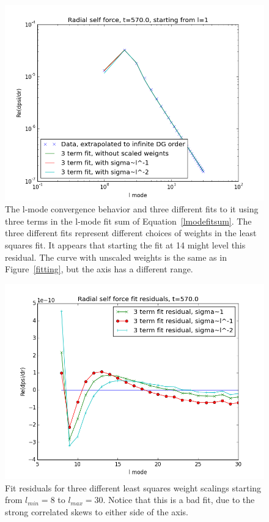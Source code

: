 \begin{figure}
  \includegraphics{fiterrscalecorrect3term570l1}
  \caption{The l-mode convergence behavior and three different fits to it using three terms in the l-mode fit sum of Equation~\ref{lmodefitsum}. The three different fits represent different choices of weights in the least squares fit. It appears that starting the fit at 14 might level this residual. The curve with unscaled weights is the same as in Figure~\ref{fitting}, but the axis has a different range.}
\label{sigmafit}
\end{figure}

\begin{figure}
\includegraphics{fitresiduals3terms570l8}
\caption{Fit residuals for three different least squares weight scalings starting from $l_{min}=8$ to $l_{max}=30$. Notice that this is a bad fit, due to the strong correlated skews to either side of the axis.}
\label{8badfit}
\end{figure}

